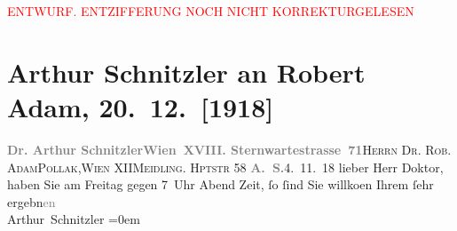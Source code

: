 
\begin{center}
            \textcolor{red}{ENTWURF. ENTZIFFERUNG NOCH NICHT KORREKTURGELESEN}
                      \end{center}
            
               \section[Arthur Schnitzler an Robert Adam, 20. 12. {[}1918{]}]{ Arthur Schnitzler an Robert Adam, 20. 12. {[}1918{]}}\nopagebreak{}\rehead{ }\begin{ledgroupsized}[t]{13cm}\normalsize\beginnumbering{} \toendnotes[C]{\smallbreak\pagebreak[2]} 
\pstart{}{\pb}\textcolor{gray}{\textbf{Dr. Arthur Schnitzler}}\pend{}\pstart{}\textcolor{gray}{\textbf{Wien XVIII. Sternwartestrasse 71}}\pend{}{\bigskip}\pstart{}\textsc{Herrn Dr. Rob. Adam}\pend{}\pstart{}\textsc{Pollak},\pend{}\pstart{}\textsc{Wien} XII\pend{}\pstart{}\textsc{Meidling. Hptstr} 58\pend{}{\bigskip}\pstart
           {\pb}\textcolor{gray}{\textbf{A. S.}}\hfill 4. 11. 18\pend
           \pstart{}lieber Herr Doktor,\pend\pstart
           haben Sie am Freitag gegen 7 Uhr Abend Zeit, ſo ſind
                    Sie willko{\geminationm}en\pend
           \pstart
           Ihrem ſehr ergebn\textcolor{gray}{en}{\\[\baselineskip]}\spacefill\mbox{Arthur Schnitzler}\pend
           \leftskip=0em{}\endnumbering{}\end{ledgroupsized}  \newcommand{\dateiname}{L02316}\newcommand{\titel}{Arthur Schnitzler an Robert Adam, 20. 12. [1918]}\newcommand{\editorInnen}{Martin Anton Müller und Gerd-Hermann Susen}
      